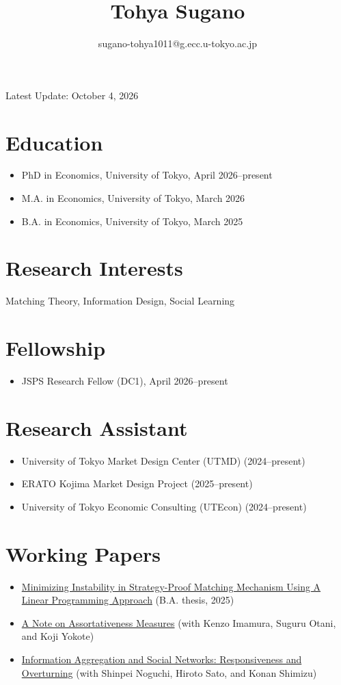\documentclass[11pt,a4paper]{article}
\begin{document}
\title{Tohya Sugano}
\author{sugano-tohya1011@g.ecc.u-tokyo.ac.jp}
\date{}
\maketitle

\noindent Latest Update: October 4, 2026

\section*{Education}
\begin{itemize}
    \item PhD in Economics, University of Tokyo, April 2026--present
    \item M.A. in Economics, University of Tokyo, March 2026
    \item B.A. in Economics, University of Tokyo, March 2025
\end{itemize}

\section*{Research Interests}
Matching Theory, Information Design, Social Learning

\section*{Fellowship}
\begin{itemize}
    \item JSPS Research Fellow (DC1), April 2026--present
\end{itemize}

\section*{Research Assistant}
\begin{itemize}
    \item University of Tokyo Market Design Center (UTMD) (2024--present)
    \item ERATO Kojima Market Design Project (2025--present)
    \item University of Tokyo Economic Consulting (UTEcon) (2024--present)
\end{itemize}

\section*{Working Papers}
\begin{itemize}
    \item \href{https://arxiv.org/abs/2502.12431}{Minimizing Instability in Strategy-Proof Matching Mechanism Using A Linear Programming Approach} (B.A. thesis, 2025)
    \item \href{https://www.mdc.e.u-tokyo.ac.jp/wp/wp-content/uploads/2025/12/UTMD-105.pdf}{A Note on Assortativeness Measures} (with Kenzo Imamura, Suguru Otani, and Koji Yokote)
    \item \href{https://arxiv.org/abs/2607.28921}{Information Aggregation and Social Networks: Responsiveness and Overturning} (with Shinpei Noguchi, Hiroto Sato, and Konan Shimizu)
\end{itemize}
\end{document}
